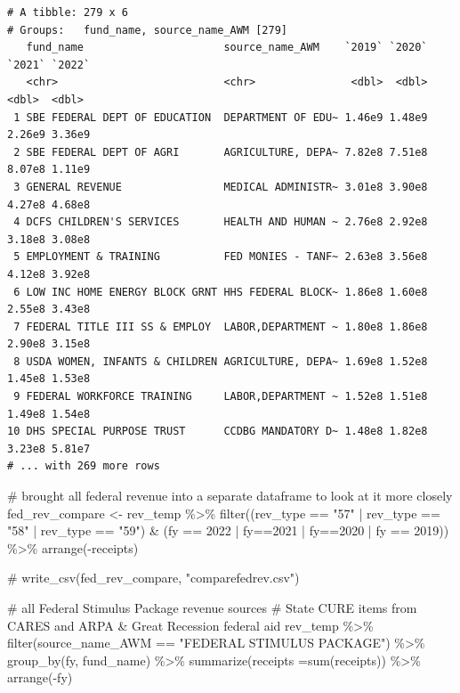 \documentclass[
  letterpaper,
  DIV=11,
  numbers=noendperiod]{scrreport}
\newenvironment{Shaded}{\begin{snugshade}}{\end{snugshade}}
\newcommand{\AttributeTok}[1]{\textcolor[rgb]{0.40,0.45,0.13}{#1}}
\newcommand{\CommentTok}[1]{\textcolor[rgb]{0.37,0.37,0.37}{#1}}
\newcommand{\DecValTok}[1]{\textcolor[rgb]{0.68,0.00,0.00}{#1}}
\newcommand{\FunctionTok}[1]{\textcolor[rgb]{0.28,0.35,0.67}{#1}}
\newcommand{\NormalTok}[1]{\textcolor[rgb]{0.00,0.23,0.31}{#1}}
\newcommand{\OtherTok}[1]{\textcolor[rgb]{0.00,0.23,0.31}{#1}}
\newcommand{\SpecialCharTok}[1]{\textcolor[rgb]{0.37,0.37,0.37}{#1}}
\newcommand{\StringTok}[1]{\textcolor[rgb]{0.13,0.47,0.30}{#1}}
\begin{document}
\begin{verbatim}
# A tibble: 279 x 6
# Groups:   fund_name, source_name_AWM [279]
   fund_name                      source_name_AWM    `2019` `2020` `2021` `2022`
   <chr>                          <chr>               <dbl>  <dbl>  <dbl>  <dbl>
 1 SBE FEDERAL DEPT OF EDUCATION  DEPARTMENT OF EDU~ 1.46e9 1.48e9 2.26e9 3.36e9
 2 SBE FEDERAL DEPT OF AGRI       AGRICULTURE, DEPA~ 7.82e8 7.51e8 8.07e8 1.11e9
 3 GENERAL REVENUE                MEDICAL ADMINISTR~ 3.01e8 3.90e8 4.27e8 4.68e8
 4 DCFS CHILDREN'S SERVICES       HEALTH AND HUMAN ~ 2.76e8 2.92e8 3.18e8 3.08e8
 5 EMPLOYMENT & TRAINING          FED MONIES - TANF~ 2.63e8 3.56e8 4.12e8 3.92e8
 6 LOW INC HOME ENERGY BLOCK GRNT HHS FEDERAL BLOCK~ 1.86e8 1.60e8 2.55e8 3.43e8
 7 FEDERAL TITLE III SS & EMPLOY  LABOR,DEPARTMENT ~ 1.80e8 1.86e8 2.90e8 3.15e8
 8 USDA WOMEN, INFANTS & CHILDREN AGRICULTURE, DEPA~ 1.69e8 1.52e8 1.45e8 1.53e8
 9 FEDERAL WORKFORCE TRAINING     LABOR,DEPARTMENT ~ 1.52e8 1.51e8 1.49e8 1.54e8
10 DHS SPECIAL PURPOSE TRUST      CCDBG MANDATORY D~ 1.48e8 1.82e8 3.23e8 5.81e7
# ... with 269 more rows
\end{verbatim}

\begin{Shaded}
\begin{Highlighting}[]
\CommentTok{\# brought all federal revenue into a separate dataframe to look at it more closely}
\NormalTok{fed\_rev\_compare }\OtherTok{\textless{}{-}} 
\NormalTok{  rev\_temp }\SpecialCharTok{\%\textgreater{}\%} \FunctionTok{filter}\NormalTok{((rev\_type }\SpecialCharTok{==} \StringTok{"57"} \SpecialCharTok{|}\NormalTok{ rev\_type }\SpecialCharTok{==} \StringTok{"58"} \SpecialCharTok{|}\NormalTok{ rev\_type }\SpecialCharTok{==} \StringTok{"59"}\NormalTok{) }\SpecialCharTok{\&}\NormalTok{ (fy }\SpecialCharTok{==} \DecValTok{2022} \SpecialCharTok{|}\NormalTok{ fy}\SpecialCharTok{==}\DecValTok{2021} \SpecialCharTok{|}\NormalTok{ fy}\SpecialCharTok{==}\DecValTok{2020} \SpecialCharTok{|}\NormalTok{ fy }\SpecialCharTok{==} \DecValTok{2019}\NormalTok{)) }\SpecialCharTok{\%\textgreater{}\%}  \FunctionTok{arrange}\NormalTok{(}\SpecialCharTok{{-}}\NormalTok{receipts)}

\CommentTok{\# write\_csv(fed\_rev\_compare, "comparefedrev.csv")}


\CommentTok{\# all Federal Stimulus Package revenue sources}
\CommentTok{\# State CURE items from CARES and ARPA \& Great Recession federal aid}
\NormalTok{rev\_temp }\SpecialCharTok{\%\textgreater{}\%} 
  \FunctionTok{filter}\NormalTok{(source\_name\_AWM }\SpecialCharTok{==} \StringTok{"FEDERAL STIMULUS PACKAGE"}\NormalTok{) }\SpecialCharTok{\%\textgreater{}\%} 
  \FunctionTok{group\_by}\NormalTok{(fy, fund\_name) }\SpecialCharTok{\%\textgreater{}\%} 
  \FunctionTok{summarize}\NormalTok{(}\AttributeTok{receipts =}\FunctionTok{sum}\NormalTok{(receipts)) }\SpecialCharTok{\%\textgreater{}\%} 
  \FunctionTok{arrange}\NormalTok{(}\SpecialCharTok{{-}}\NormalTok{fy)}
\end{Highlighting}
\end{Shaded}
\end{document}
